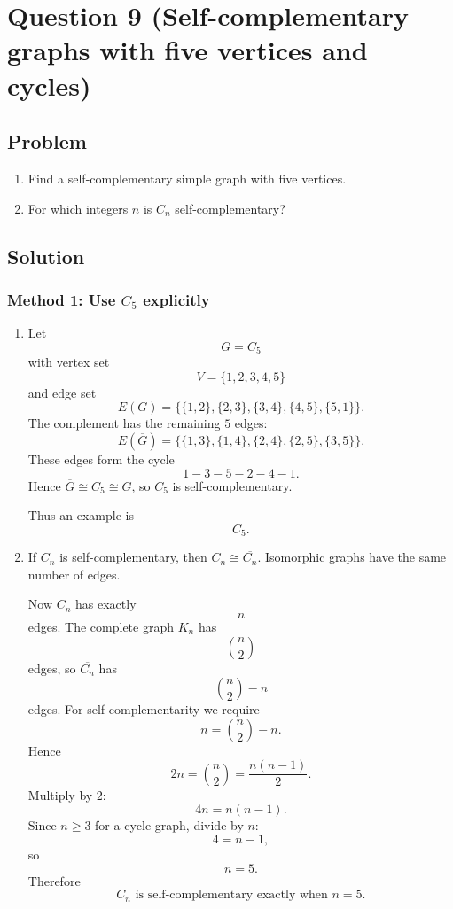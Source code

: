 \documentclass[12pt]{article}
\newcommand{\comp}[1]{\overline{#1}}
\begin{document}
\newpage

\section{Question 9 (Self-complementary graphs with five vertices and cycles)}

\subsection{Problem}
\begin{enumerate}[label=(\alph*)]
\item Find a self-complementary simple graph with five vertices.
\item For which integers \(n\) is \(C_n\) self-complementary?
\end{enumerate}

\subsection{Solution}

\subsubsection{Method 1: Use \(C_5\) explicitly}
\begin{enumerate}[label=(\alph*)]
\item Let
\[
G=C_5
\]
with vertex set
\[
V=\{1,2,3,4,5\}
\]
and edge set
\[
E(G)=\bigl\{\{1,2\},\{2,3\},\{3,4\},\{4,5\},\{5,1\}\bigr\}.
\]
The complement has the remaining \(5\) edges:
\[
E(\comp{G})=
\bigl\{\{1,3\},\{1,4\},\{2,4\},\{2,5\},\{3,5\}\bigr\}.
\]
These edges form the cycle
\[
1-3-5-2-4-1.
\]
Hence \(\comp{G}\cong C_5\cong G\), so \(C_5\) is self-complementary.

Thus an example is
\[
\boxed{C_5.}
\]

\item If \(C_n\) is self-complementary, then \(C_n\cong \comp{C_n}\). Isomorphic graphs have the same number of edges.

Now \(C_n\) has exactly
\[
n
\]
edges. The complete graph \(K_n\) has
\[
\binom{n}{2}
\]
edges, so \(\comp{C_n}\) has
\[
\binom{n}{2}-n
\]
edges. For self-complementarity we require
\[
n=\binom{n}{2}-n.
\]
Hence
\[
2n=\binom{n}{2}=\frac{n(n-1)}{2}.
\]
Multiply by \(2\):
\[
4n=n(n-1).
\]
Since \(n\ge 3\) for a cycle graph, divide by \(n\):
\[
4=n-1,
\]
so
\[
n=5.
\]
Therefore
\[
\boxed{C_n \text{ is self-complementary exactly when } n=5.}
\]
\end{enumerate}
\end{document}
